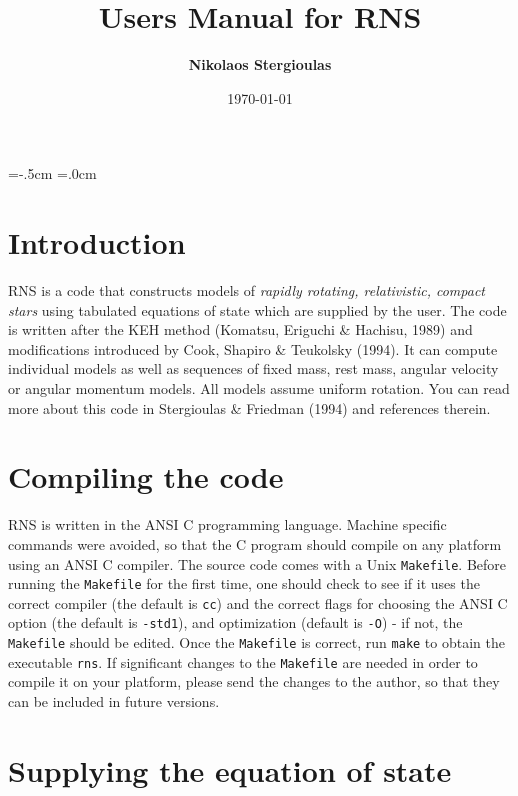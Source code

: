 \topmargin=-.5cm
\textheight=22cm
\oddsidemargin=.0cm
\textwidth=15.8cm
\baselineskip=18pt
\def\bee{\begin{equation}}
\def\ee{\end{equation}}
\def\<{\noindent }



\title{\bf Users Manual for RNS}
\author{ \bf Nikolaos Stergioulas}
\date{\today}
\maketitle

\section{Introduction}

RNS is a code that constructs models of {\it rapidly rotating, relativistic, 
compact stars} using tabulated equations of state which are supplied by the 
user.
The code is written after the KEH method (Komatsu, Eriguchi \& Hachisu, 
1989) and modifications introduced by Cook, Shapiro \& Teukolsky (1994). 
It can compute individual models as well as sequences of 
fixed mass, rest mass, angular velocity or angular momentum models. All models
assume uniform rotation. You can read more about this code in 
Stergioulas \& Friedman (1994) and references therein.
 
\section{Compiling the code}

RNS is written in the ANSI C programming language. Machine specific 
commands were avoided,
so that the C program should compile on any platform using an ANSI C compiler.
The source code comes with a Unix {\tt Makefile}. Before running the 
{\tt Makefile} for the first time, one should check to see if it uses the 
correct compiler (the default is {\tt cc}) and the correct flags for choosing 
the ANSI C option (the default is {\tt -std1}), and optimization (default 
is {\tt -O})
 - if not, the {\tt Makefile} should be edited. Once the {\tt Makefile} is 
correct, run {\tt make} to obtain the executable {\tt rns}. If 
significant changes to the {\tt Makefile} are needed in order to compile it on 
your platform, please send the changes
to the author, so that they can be included in future versions.

\section{Supplying the equation of state}

